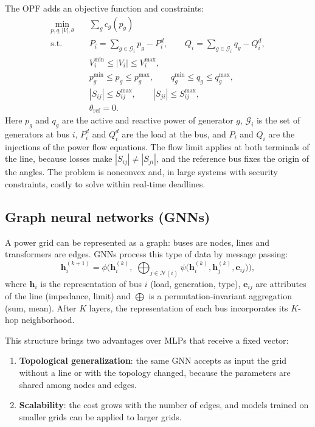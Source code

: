 \documentclass[10pt,a4paper,oneside]{article}
\begin{document}
The OPF adds an objective function and constraints:
\begin{equation}
\begin{aligned}
  \min_{p, q, |V|, \theta} \quad & \sum_{g} c_g(p_g) \\
  \text{s.t.} \quad
  & P_i = \sum_{g \in \mathcal{G}_i} p_g - P^{d}_i, \qquad
    Q_i = \sum_{g \in \mathcal{G}_i} q_g - Q^{d}_i, \\
  & V_i^{\min} \le |V_i| \le V_i^{\max}, \\
  & p_g^{\min} \le p_g \le p_g^{\max}, \qquad
    q_g^{\min} \le q_g \le q_g^{\max}, \\
  & |S_{ij}| \le S_{ij}^{\max}, \qquad |S_{ji}| \le S_{ij}^{\max}, \\
  & \theta_{\mathrm{ref}} = 0.
\end{aligned}
\end{equation}
Here $p_g$ and $q_g$ are the active and reactive power of generator $g$,
$\mathcal{G}_i$ is the set of generators at bus $i$, $P^{d}_i$ and $Q^{d}_i$
are the load at the bus, and $P_i$ and $Q_i$ are the injections of the power
flow equations. The flow limit applies at both terminals of the line,
because losses make $|S_{ij}| \ne |S_{ji}|$, and the reference bus fixes the
origin of the angles. The problem is nonconvex and, in large systems with
security constraints, costly to solve within real-time deadlines.

\subsection{Graph neural networks (GNNs)}

A power grid can be represented as a graph: buses are nodes, lines and
transformers are edges. GNNs process this type of data by message passing:
\begin{equation}
  \mathbf{h}_i^{(k+1)} = \phi\Big(\mathbf{h}_i^{(k)},\;
  \bigoplus_{j \in \mathcal{N}(i)} \psi\big(\mathbf{h}_i^{(k)}, \mathbf{h}_j^{(k)}, \mathbf{e}_{ij}\big)\Big),
\end{equation}
where $\mathbf{h}_i$ is the representation of bus $i$ (load, generation,
type), $\mathbf{e}_{ij}$ are attributes of the line (impedance, limit) and
$\bigoplus$ is a permutation-invariant aggregation (sum, mean). After $K$
layers, the representation of each bus incorporates its $K$-hop
neighborhood.

This structure brings two advantages over MLPs that receive a fixed vector:
\begin{enumerate}
  \item \textbf{Topological generalization}: the same GNN accepts as input
    the grid without a line or with the topology changed, because the
    parameters are shared among nodes and edges.
  \item \textbf{Scalability}: the cost grows with the number of edges, and
    models trained on smaller grids can be applied to larger grids.
\end{enumerate}
\end{document}
